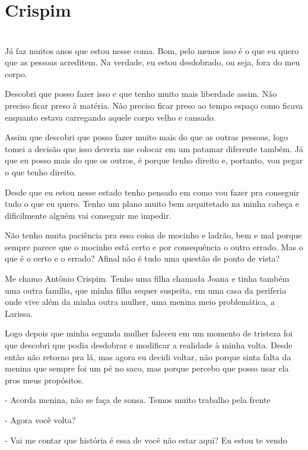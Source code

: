 
\newpage


\ifdefined\useChapters
\chapter{Crispim}
\else
\chapter{}
\fi
Já faz muitos anos que estou nesse coma. Bom, pelo menos isso é o que eu quero que as pessoas acreditem. Na verdade, eu estou desdobrado, ou seja, fora do meu corpo.

Descobri que posso fazer isso e que tenho muito mais liberdade assim. Não preciso ficar preso à matéria. Não preciso ficar preso ao tempo espaço como ficava enquanto estava carregando aquele corpo velho e cansado.

Assim que descobri que posso fazer muito mais do que as outras pessoas, logo tomei a decisão que isso deveria me colocar em um patamar diferente também. Já que eu posso mais do que os outros, é porque tenho direito e, portanto, vou pegar o que tenho direito.

Desde que eu estou nesse estado tenho pensado em como vou fazer pra conseguir tudo o que eu quero. Tenho um plano muito bem arquitetado na minha cabeça e dificilmente alguém vai conseguir me impedir. 

Não tenho muita paciência pra essa coisa de mocinho e ladrão, bem e mal porque sempre parece que o mocinho está certo e por consequência o outro errado. Mas o que é o certo e o errado? Afinal não é tudo uma questão de ponto de vista?

Me chamo Antônio Crispim. Tenho uma filha chamada Joana e tinha também uma outra família, que minha filha sequer suspeita, em uma casa da periferia onde vive além da minha outra mulher, uma menina meio problemática, a Larissa. 

Logo depois que minha segunda mulher faleceu em um momento de tristeza foi que descobri que podia desdobrar e modificar a realidade à minha volta. Desde então não retorno pra lá, mas agora eu decidi voltar, não porque sinta falta da menina que sempre foi um pé no saco, mas porque percebo que posso usar ela pros meus propósitos.

- Acorda menina, não se faça de sonsa. Temos muito trabalho pela frente

- Agora você volta?

- Vai me contar que história é essa de você não estar aqui? Eu estou te vendo

